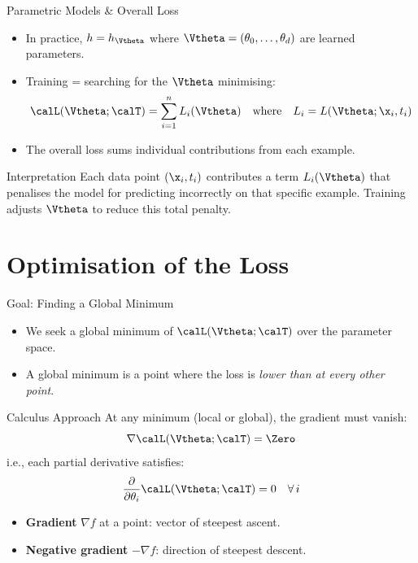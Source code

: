 \begin{frame}{Parametric Models \& Overall Loss}
  \begin{itemize}
    \item In practice, $h = h_{\Vtheta}$ where $\Vtheta = (\theta_0,\ldots,\theta_d)$ are learned parameters.
    \item Training = searching for the $\Vtheta$ minimising:
      \[
        \calL(\Vtheta;\calT) = \sum_{i=1}^{n} L_i(\Vtheta)
        \quad \text{where}\quad L_i = L(\Vtheta;\x_i,t_i)
      \]
    \item The overall loss sums individual contributions from each example.
  \end{itemize}

  \vspace{.5em}
  \begin{exampleblock}{Interpretation}
    Each data point $(\x_i, t_i)$ contributes a term $L_i(\Vtheta)$ that penalises
    the model for predicting incorrectly on that specific example.
    Training adjusts $\Vtheta$ to reduce this total penalty.
  \end{exampleblock}
\end{frame}

\section{Optimisation of the Loss}

\begin{frame}{Goal: Finding a Global Minimum}
  \begin{itemize}
    \item We seek a \alert{global minimum} of $\calL(\Vtheta;\calT)$ over the parameter space.
    \item A global minimum is a point where the loss is \emph{lower than at every other point}.
  \end{itemize}

  \vspace{.4em}
  \begin{block}{Calculus Approach}
    At any minimum (local or global), the gradient must vanish:
    \[
      \nabla \calL(\Vtheta;\calT) = \Zero
    \]
    i.e., each partial derivative satisfies:
    \[
      \frac{\partial}{\partial \theta_i}\calL(\Vtheta;\calT) = 0 \quad \forall\, i
    \]
  \end{block}

  \begin{itemize}
    \item \textbf{Gradient} $\nabla f$ at a point: vector of steepest ascent.
    \item \textbf{Negative gradient} $-\nabla f$: direction of steepest descent.
  \end{itemize}
\end{frame}


